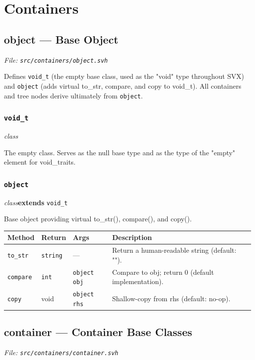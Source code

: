 \documentclass[11pt,letterpaper]{report}
\begin{document}
\chapter{Containers}
\section{object --- Base Object}
\noindent\small\textit{File: \texttt{src/containers/object.svh}}\par

Defines \texttt{void\_t} (the empty base class, used as the "void" type throughout SVX) and \texttt{object} (adds virtual to\_str, compare, and copy to void\_t). All containers and tree nodes derive ultimately from \texttt{object}.

\subsection*{\texttt{void\_t}}
\noindent\small\textit{class}\par

The empty class. Serves as the null base type and as the type of the "empty" element for void\_traits.


\subsection*{\texttt{object}}
\noindent\small\textit{class}\quad \textbf{extends} \texttt{void\_t}\par

Base object providing virtual to\_str(), compare(), and copy().

\begin{xltabular}{\linewidth}{>{\small}p{1.35in} >{\small}p{1.25in} >{\small}p{0.95in} >{\small}X}
\toprule
\textbf{Method} & \textbf{Return} & \textbf{Args} & \textbf{Description} \\
\midrule
\endhead
\bottomrule
\endfoot
\texttt{to\_str} & \texttt{string} & --- & Return a human-readable string (default: ""). \\
\texttt{compare} & \texttt{int} & \texttt{object obj} & Compare to obj; return 0 (default implementation). \\
\texttt{copy} & void & \texttt{object rhs} & Shallow-copy from rhs (default: no-op). \\
\end{xltabular}

\section{container --- Container Base Classes}
\noindent\small\textit{File: \texttt{src/containers/container.svh}}\par
\end{document}

